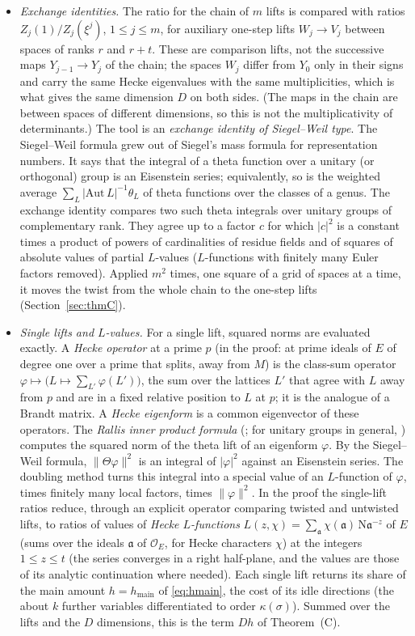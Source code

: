 \documentclass[11pt]{amsart}
\numberwithin{equation}{section}
\theoremstyle{definition}
\theoremstyle{remark}
\newcommand{\cO}{\mathcal O}
\begin{document}
\begin{itemize}[leftmargin=2em]
\item \emph{Exchange identities.} The ratio for the chain of $m$ lifts is compared with ratios $Z_j(1)/Z_j(\xi^j)$, $1\le j\le m$, for auxiliary one-step lifts $W_j\to V_j$ between spaces of ranks $r$ and $r+t$. These are comparison lifts, not the successive maps $Y_{j-1}\to Y_j$ of the chain; the spaces $W_j$ differ from $Y_0$ only in their signs and carry the same Hecke eigenvalues with the same multiplicities, which is what gives the same dimension $D$ on both sides. (The maps in the chain are between spaces of different dimensions, so this is not the multiplicativity of determinants.) The tool is an \emph{exchange identity of Siegel--Weil type}. The Siegel--Weil formula \cite{siegel,weil} grew out of Siegel's mass formula for representation numbers. It says that the integral of a theta function over a unitary (or orthogonal) group is an Eisenstein series; equivalently, so is the weighted average $\sum_L|\mathrm{Aut}\,L|^{-1}\theta_L$ of theta functions over the classes of a genus. The exchange identity compares two such theta integrals over unitary groups of complementary rank. They agree up to a factor $c$ for which $|c|^2$ is a constant times a product of powers of cardinalities of residue fields and of squares of absolute values of partial $L$-values ($L$-functions with finitely many Euler factors removed). Applied $m^2$ times, one square of a grid of spaces at a time, it moves the twist from the whole chain to the one-step lifts (Section~\ref{sec:thmC}).
\item \emph{Single lifts and $L$-values.} For a single lift, squared norms are evaluated exactly. A \emph{Hecke operator} at a prime $p$ (in the proof: at prime ideals of $E$ of degree one over a prime that splits, away from $M$) is the class-sum operator $\varphi\mapsto\bigl(L\mapsto\sum_{L'}\varphi(L')\bigr)$, the sum over the lattices $L'$ that agree with $L$ away from $p$ and are in a fixed relative position to $L$ at $p$; it is the analogue of a Brandt matrix. A \emph{Hecke eigenform} is a common eigenvector of these operators. The \emph{Rallis inner product formula} (\cite{rallis,rallisLNM}; for unitary groups in general, \cite{KR,GQT}) computes the squared norm of the theta lift of an eigenform $\varphi$. By the Siegel--Weil formula, $\|\Theta\varphi\|^2$ is an integral of $|\varphi|^2$ against an Eisenstein series. The doubling method turns this integral into a special value of an $L$-function of $\varphi$, times finitely many local factors, times $\|\varphi\|^2$. In the proof the single-lift ratios reduce, through an explicit operator comparing twisted and untwisted lifts, to ratios of values of \emph{Hecke $L$-functions} $L(z,\chi)=\sum_{\mathfrak a}\chi(\mathfrak a)\,\mathrm N\mathfrak a^{-z}$ of $E$ (sums over the ideals $\mathfrak a$ of $\cO_E$, for Hecke characters $\chi$) at the integers $1\le z\le t$ (the series converges in a right half-plane, and the values are those of its analytic continuation where needed). Each single lift returns its share of the main amount $h=h_{\mathrm{main}}$ of \eqref{eq:hmain}, the cost of its idle directions (the about $k$ further variables differentiated to order $\kappa(\sigma)$). Summed over the lifts and the $D$ dimensions, this is the term $Dh$ of Theorem~(C).
\end{itemize}
\end{document}
